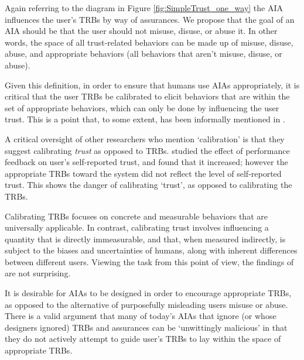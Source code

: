     Again referring to the diagram in Figure \ref{fig:SimpleTrust_one_way} the AIA influences the user's TRBs by way of assurances. We propose that the goal of an AIA should be that the user should not misuse, disuse, or abuse it. In other words, the space of all trust-related behaviors can be made up of misuse, disuse, abuse, and appropriate behaviors (all behaviors that aren't misuse, disuse, or abuse).
    
    Given this definition, in order to ensure that humans use AIAs appropriately, it is critical that the user TRBs be calibrated to elicit behaviors that are within the set of appropriate behaviors, which can only be done by influencing the user trust. This is a point that, to some extent, has been informally mentioned in \citet{Muir1994-ow,Muir1987-mk,Lillard2016-yg,Lee2004-pv,Hutchins2015-if}.

    A critical oversight of other researchers who mention `calibration' is that they suggest calibrating \emph{trust} as opposed to TRBs. \citet{Dzindolet2003-ts} studied the effect of performance feedback on user's self-reported trust, and found that it increased; however the appropriate TRBs toward the system did not reflect the level of self-reported trust. This shows the danger of calibrating `trust', as opposed to calibrating the TRBs.

    Calibrating TRBs focuses on concrete and measurable behaviors that are universally applicable. In contrast, calibrating trust involves influencing a quantity that is directly immeasurable, and that, when measured indirectly, is subject to the biases and uncertainties of humans, along with inherent differences between different users. Viewing the task from this point of view, the findings of \citeauthor{Dzindolet2003-ts} are not surprising.

    It is desirable for AIAs to be designed in order to encourage appropriate TRBs, as opposed to the alternative of purposefully misleading users misuse or abuse. There is a valid argument that many of today's AIAs that ignore (or whose designers ignored) TRBs and assurances can be `unwittingly malicious' in that they do not actively attempt to guide user's TRBs to lay within the space of appropriate TRBs.
